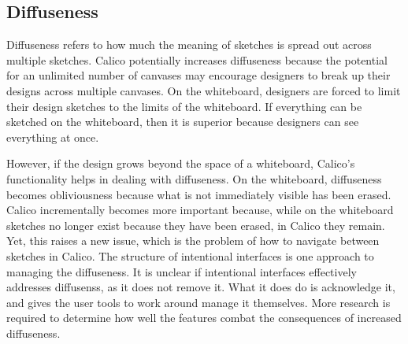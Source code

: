 \subsection{Diffuseness}

%
%
%

Diffuseness refers to how much the meaning of sketches is spread out across multiple sketches. Calico potentially increases diffuseness because the potential for an unlimited number of canvases may encourage designers to break up their designs across multiple canvases. On the whiteboard, designers are forced to limit their design sketches to the limits of the whiteboard.  If everything can be sketched on the whiteboard, then it is superior because designers can see everything at once. 

However, if the design grows beyond the space of a whiteboard, Calico's functionality helps in dealing with diffuseness. On the whiteboard, diffuseness becomes obliviousness because what is not immediately visible has been erased. Calico incrementally becomes more important because, while on the whiteboard sketches no longer exist because they have been erased, in Calico they remain. Yet, this raises a new issue, which is the problem of how to navigate between sketches in Calico. The structure of intentional interfaces is one approach to managing the diffuseness. It is unclear if intentional interfaces effectively addresses diffusenss, as it does not remove it. What it does do is acknowledge it, and gives the user tools to work around manage it themselves. More research is required to determine how well the features combat the consequences of increased diffuseness.

